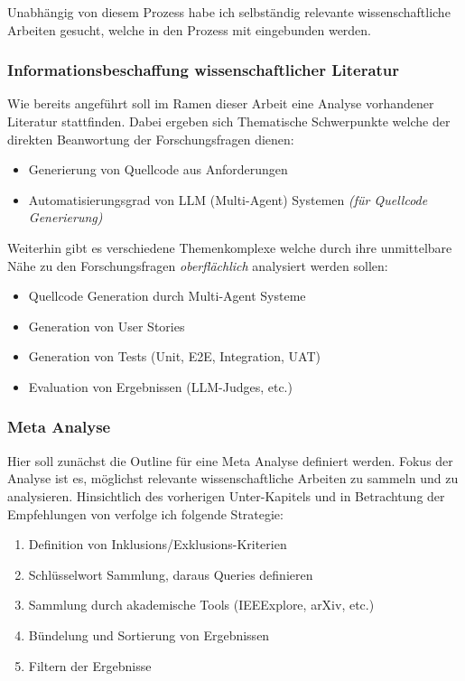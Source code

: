 Unabhängig von diesem Prozess habe ich selbständig relevante wissenschaftliche Arbeiten gesucht, welche in den Prozess mit eingebunden werden.

\subsubsection{Informationsbeschaffung wissenschaftlicher Literatur}

Wie bereits angeführt soll im Ramen dieser Arbeit eine Analyse vorhandener Literatur stattfinden. Dabei ergeben sich Thematische Schwerpunkte welche der direkten Beanwortung der Forschungsfragen dienen:

\begin{itemize}
    \item Generierung von Quellcode aus Anforderungen
    \item Automatisierungsgrad von LLM (Multi-Agent) Systemen \textit{(für Quellcode Generierung)}
\end{itemize}

Weiterhin gibt es verschiedene Themenkomplexe welche durch ihre unmittelbare Nähe zu den Forschungsfragen \textit{oberflächlich} analysiert werden sollen:

\begin{itemize}
    \item Quellcode Generation durch Multi-Agent Systeme
    \item Generation von User Stories
    \item Generation von Tests (Unit, E2E, Integration, UAT)
    \item Evaluation von Ergebnissen (LLM-Judges, etc.)
\end{itemize}

\subsubsection{Meta Analyse}

Hier soll zunächst die Outline für eine Meta Analyse definiert werden. Fokus der Analyse ist es, möglichst relevante wissenschaftliche Arbeiten zu sammeln und zu analysieren. Hinsichtlich des vorherigen Unter-Kapitels und in Betrachtung der Empfehlungen von \cite{kitchenhamGuidelinesPerformingSystematic2007} verfolge ich folgende Strategie:

\begin{enumerate}
    \item Definition von Inklusions/Exklusions-Kriterien
    \item Schlüsselwort Sammlung, daraus Queries definieren
    \item Sammlung durch akademische Tools (IEEExplore, arXiv, etc.)
    \item Bündelung und Sortierung von Ergebnissen
    \item Filtern der Ergebnisse
\end{enumerate}

